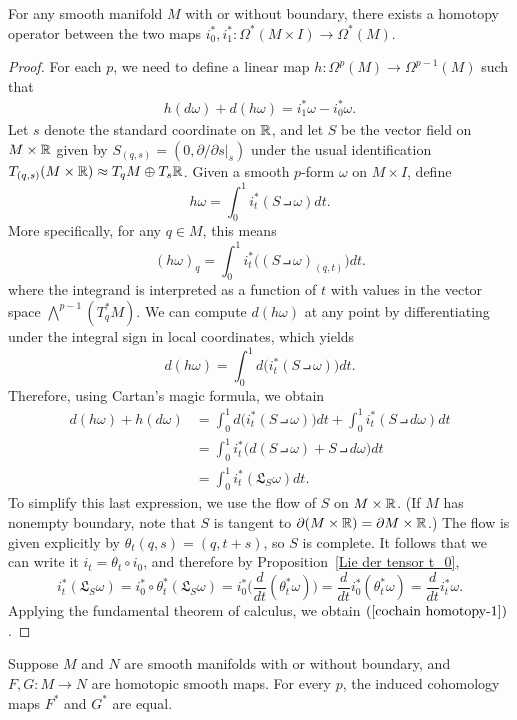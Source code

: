 \begin{lemma}
For any smooth manifold $M$ with or without boundary, there exists a homotopy operator between the two maps $i_0^*,i_1^*:\Omega^*(M\times I)\to\Omega^*(M)$.
\end{lemma}
\begin{proof}
For each $p$, we need to define a linear map $h:\Omega^p(M)\to\Omega^{p-1}(M)$ such that
\begin{align}\label{cochain homotopy-1}
h(d\omega)+d(h\omega)=i_1^*\omega-i_0^*\omega.
\end{align}
Let $s$ denote the standard coordinate on $\mathbb{R}$, and let $S$ be the vector field on $M\times\mathbb{R}$ given by $S_{(q,s)}=(0,\partial/\partial s|_s)$ under the usual identification $T_{(q,s)}(M\times\mathbb{R})\approx T_qM\oplus T_s\mathbb{R}$. Given a smooth $p$-form $\omega$ on $M\times I$, define
\[h\omega=\int_{0}^{1}i_t^*(S\intprod\omega)dt.\]
More specifically, for any $q\in M$, this means
\[(h\omega)_q=\int_{0}^{1}i_t^*\big((S\intprod\omega)_{(q,t)}\big)dt.\]
where the integrand is interpreted as a function of $t$ with values in the vector space $\bigwedge^{p-1}(T^*_qM)$. We can compute $d(h\omega)$ at any point by differentiating under the integral sign in local coordinates, which yields
\[d(h\omega)=\int_{0}^{1}d\big(i_t^*(S\intprod\omega)\big)dt.\]
Therefore, using Cartan's magic formula, we obtain
\begin{align*}
d(h\omega)+h(d\omega)&=\int_{0}^{1}d\big(i_t^*(S\intprod\omega)\big)dt+\int_{0}^{1}i_t^*(S\intprod d\omega)dt\\
&=\int_{0}^{1}i_t^*\big(d(S\intprod\omega)+S\intprod d\omega\big)dt\\
&=\int_{0}^{1}i_t^*(\mathfrak{L}_S\omega)dt.
\end{align*}
To simplify this last expression, we use the flow of $S$ on $M\times\mathbb{R}$. (If $M$ has
nonempty boundary, note that $S$ is tangent to $\partial(M\times\mathbb{R})=\partial M\times\mathbb{R}$.) The flow is given explicitly by $\theta_t(q,s)=(q,t+s)$, so $S$ is complete. 
It follows that we can write it $i_t=\theta_t\circ i_0$, and therefore by Proposition~\ref{Lie der tensor t_0},
\[i_t^*(\mathfrak{L}_S\omega)=i_0^*\circ\theta_t^*(\mathfrak{L}_S\omega)=i_0^*\Big(\frac{d}{dt}(\theta_t^*\omega)\Big)=\frac{d}{dt}i_0^*(\theta_t^*\omega)=\frac{d}{dt}i_t^*\omega.\]
Applying the fundamental theorem of calculus, we obtain $(\ref{cochain homotopy-1})$.
\end{proof}
\begin{proposition}\label{cohomology homotopy map}
Suppose $M$ and $N$ are smooth manifolds with or without boundary, and $F,G:M\to N$ are homotopic smooth maps. For every $p$, the induced cohomology maps $F^*$ and $G^*$ are equal.
\end{proposition}
